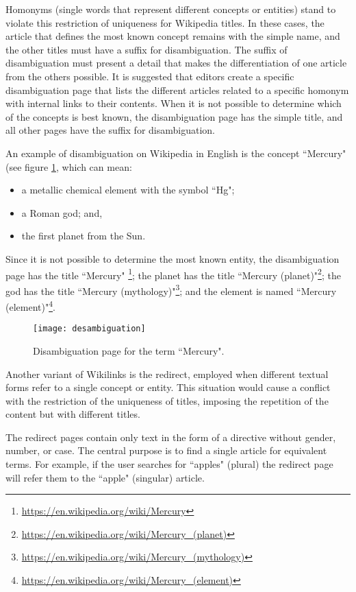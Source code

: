 Homonyms (single words that represent different concepts or entities) stand to violate this restriction of uniqueness for Wikipedia titles. In these cases, the article that defines the most known concept remains with the simple name, and the other titles must have a suffix for disambiguation. The suffix of disambiguation must present a detail that makes the differentiation of one article from the others possible. It is suggested that editors create a specific disambiguation page that lists the different articles related to a specific homonym with internal links to their contents. When it is not possible to determine which of the concepts is best known, the disambiguation page has the simple title, and all other pages have the suffix for disambiguation.


An example of disambiguation on Wikipedia in English is the concept ``Mercury" (see figure \ref{fig:mercury-desambiguation}, which can mean:

 \begin {itemize}
 \item a metallic chemical element with the symbol ``Hg";
 \item a Roman god; and,
 \item the first planet from the Sun.
 \end {itemize}


 Since it is not possible to determine the most known entity,  the disambiguation page has the title ``Mercury" \footnote{\url{https://en.wikipedia.org/wiki/Mercury}}; the planet has the title ``Mercury (planet)"\footnote{\url{https://en.wikipedia.org/wiki/Mercury_(planet)}}; the god has the title ``Mercury (mythology)"\footnote{\url{https://en.wikipedia.org/wiki/Mercury_(mythology)}}; and the element is named ``Mercury (element)"\footnote{\url{https://en.wikipedia.org/wiki/Mercury_(element)}}.

\begin{figure}[!h]
\centering
  \texttt{[image: desambiguation]}
  \caption{Disambiguation page for the term ``Mercury".}
  \label{fig:mercury-desambiguation}
\end{figure}


Another variant of Wikilinks is the redirect, employed when different textual forms refer to a single concept or entity. This situation would cause a conflict with the restriction of the uniqueness of titles, imposing the repetition of the content but with different titles. 

The redirect pages contain only text in the form of a directive without gender, number, or case. The central purpose is to find a single article for equivalent terms. For example, if the user searches for ``apples" (plural) the redirect page will refer them to the ``apple" (singular) article. 

